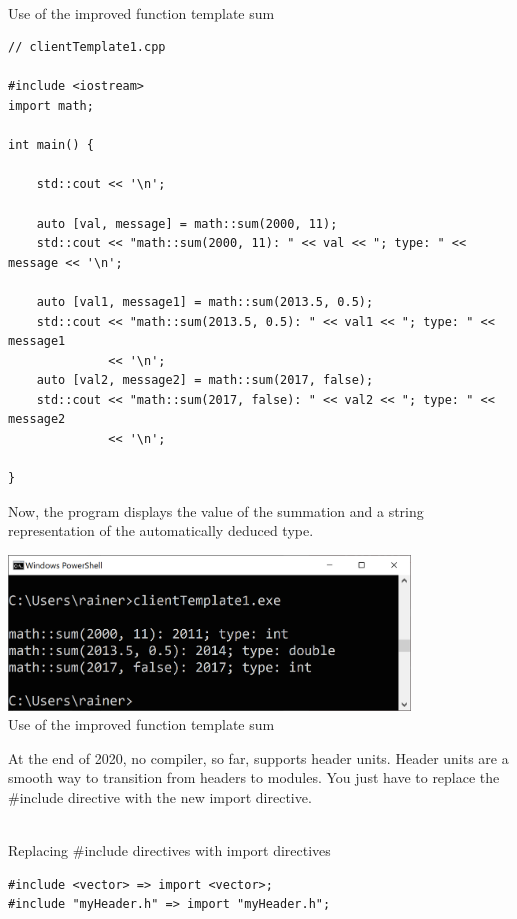 \hspace*{\fill} \\ %
\noindent
Use of the improved function template sum
\begin{lstlisting}[style=styleCXX]
// clientTemplate1.cpp

#include <iostream>
import math;

int main() {
	
	std::cout << '\n';
	
	auto [val, message] = math::sum(2000, 11);
	std::cout << "math::sum(2000, 11): " << val << "; type: " << message << '\n';
	
	auto [val1, message1] = math::sum(2013.5, 0.5);
	std::cout << "math::sum(2013.5, 0.5): " << val1 << "; type: " << message1
			  << '\n';
	auto [val2, message2] = math::sum(2017, false);
	std::cout << "math::sum(2017, false): " << val2 << "; type: " << message2
			  << '\n';

}
\end{lstlisting}

Now, the program displays the value of the summation and a string representation of the automatically deduced type.

\begin{center}
\includegraphics[width=0.8\textwidth]{content/3/chapter4/images/25.png}\\
Use of the improved function template sum
\end{center}


At the end of 2020, no compiler, so far, supports header units. Header units are a smooth way to transition from headers to modules. You just have to replace the \#include directive with the new import directive.

\hspace*{\fill} \\ %
\noindent
Replacing \#include directives with import directives
\begin{lstlisting}[style=styleCXX]
#include <vector> => import <vector>;
#include "myHeader.h" => import "myHeader.h";
\end{lstlisting}

